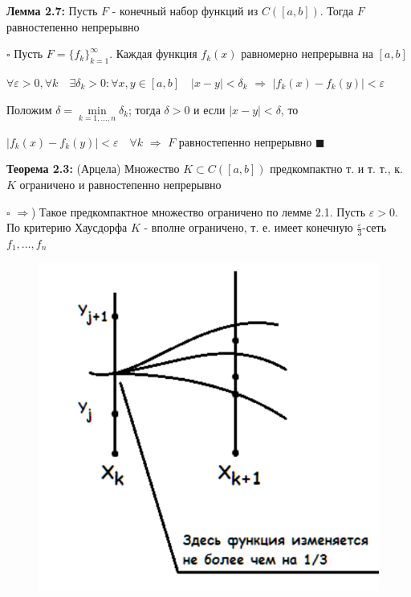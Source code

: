\documentclass[a4paper]{report}
\begin{document}
\noindent\textbf{Лемма 2.7:} Пусть $F$ - конечный набор функций из $C([a,b])$. Тогда $F$ равностепенно непрерывно

\noindent $\square$ Пусть $F=\{f_k\}_{k=1}^\infty$. Каждая функция $f_k(x)$ равномерно непрерывна на $[a,b]$

$\forall\varepsilon>0,\forall k\quad\exists\delta_k>0\colon\forall x,y\in[a,b]\quad|x-y|<\delta_k$ $\Rightarrow$ 
$|f_k(x)-f_k(y)|<\varepsilon$

Положим $\delta=\min\limits_{k=1,\ldots,n}\delta_k$; тогда $\delta>0$ и если $|x-y|<\delta$, то 

$|f_k(x)-f_k(y)|<\varepsilon\quad\forall k$ $\Rightarrow$ $F$ равностепенно непрерывно $\blacksquare$
\bigskip

\noindent\textbf{Теорема 2.3:} (Арцела) Множество $K\subset C([a,b])$ предкомпактно т. и т. т., к. $K$ ограничено и 
равностепенно непрерывно

\noindent $\square$ $\Rightarrow$) Такое предкомпактное множество ограничено по лемме 2.1. Пусть $\varepsilon>0$. По 
критерию Хаусдорфа $K$ - вполне ограничено, т. е. имеет конечную $\frac\varepsilon3$-сеть $f_1,\ldots,f_n$

\begin{figure} 
\includegraphics[width=\linewidth]{124}
\end{figure}
\end{document}
